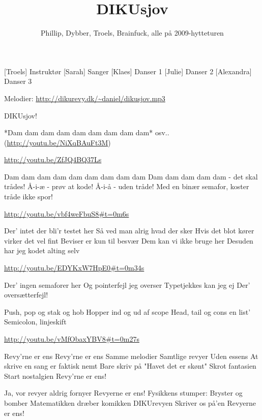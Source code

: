 \documentclass[a4paper,11pt]{article}
\title{DIKUsjov}
\author{Phillip, Dybber, Troels, Brainfuck, alle på 2009-hytteturen}
\begin{document}
\maketitle

\begin{roles}
[Troels] Instruktør
[Sarah] Sanger
[Klaes] Danser 1
[Julie] Danser 2
[Alexandra] Danser 3
\end{roles}

\begin{song}
Melodier: \url{http://dikurevy.dk/~daniel/dikusjov.mp3}

DIKUsjov!

*Dam dam dam dam dam dam dam dam dam* osv.. (\url{http://youtu.be/NiXqBAuFt3M})

\url{http://youtu.be/ZfJQ4BQ37Ls}

Dam dam dam dam dam dam dam dam dam
Dam dam dam dam dam - det skal trådes!
Å-i-æ - prøv at kode!
Å-i-å - uden tråde!
Med en binær semafor, koster tråde ikke spor!

\url{http://youtu.be/vbf4weFbuS8\#t=0m6s}

Der' intet der bli'r testet her
Så ved man alrig hvad der sker
Hvis det blot kører virker det vel fint
Beviser er kun til besvær
Dem kan vi ikke bruge her
Desuden har jeg kodet alting selv

\url{http://youtu.be/EDYKxW7HpE0\#t=0m34s}

Der' ingen semaforer her
Og pointerfejl jeg overser
Typetjekkes kan jeg ej
Der' oversætterfejl!

Push, pop og stak og hob
Hopper ind og ud af scope
Head, tail og cons en list'
Semicolon, linjeskift

\url{http://youtu.be/vMfObaxYBV8\#t=0m27s}

Revy'rne er ens
Revy'rne er ens
Samme melodier
Samtlige revyer
Uden essens
At skrive en sang er faktisk nemt
Bare skriv på "Havet det er skønt"
Skrot fantasien
Start nostalgien
Revy'rne er ens!

Ja, vor revyer
aldrig fornyer
Revyerne er ens!
Fysikkens stumper:
Bryster og bomber
Matematikken
dræber komikken
DIKUrevyen
Skriver os på'en
Revyerne er ens!

\end{song}
\end{document}
